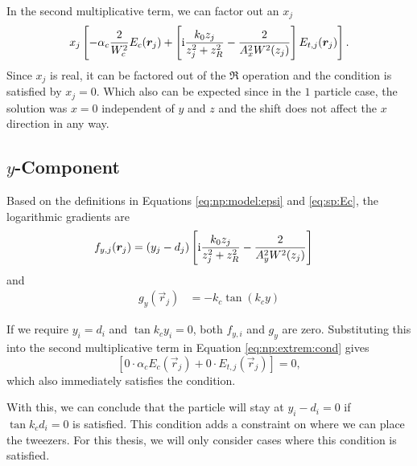 In the second multiplicative term, 
    we can factor out an $x_j$
\begin{equation}
   x_j \left[ 
        -\alpha_c \frac{2}{W_c^2}E_c(\bm{r}_j) 
        + \left[\mathrm{i} \frac{k_0z_j}{z_j^2 + z_R^2} 
        - \frac{2}{A_x^2 W^2(z_j)}\right]E_{t,j}(\bm{r}_j) 
    \right] .
\end{equation}
Since $x_j$ is real, it can be factored out of the $\Re$ operation 
    and the condition is satisfied by $x_j = 0$.
Which also can be expected since in the $1$ particle case, 
    the solution was $x = 0$ independent of $y$ and $z$
    and the shift does not affect the $x$ direction in any way.


\subsection{\texorpdfstring{$y$}{y}-Component}
\label{ssec:np:extrem:y}

Based on the definitions in Equations \eqref{eq:np:model:epsi} and \eqref{eq:sp:Ec},
    the logarithmic gradients are
\begin{align}
    f_{y,j}( \bm{r}_j) &= (y_j-d_j) \left[ \mathrm{i}\frac{k_0z_j}{z_j^2+z_R^2} - \frac{2}{A_y^2 W^2(z_j)}\right]
\end{align}
and
\begin{align}
g_y(\vec r_j) &= - k_c\tan(k_c y) 
\end{align}

If we require $y_i = d_i$ and $\tan k_c y_i = 0$, both $f_{y, i}$ and $g_y$ are zero.
Substituting this into the second multiplicative term in Equation \eqref{eq:np:extrem:cond} gives
\begin{equation}
  \left[ 0 \cdot \alpha_c E_c(\vec r_j) + 0\cdot E_{t,j}(\vec r_j) \right] {=} 0,
\end{equation}
which also immediately satisfies the condition.

With this, we can conclude that the particle will stay at $y_i - d_i = 0$ if $\tan k_c d_i =0 $ is satisfied. 
This condition adds a constraint on where we can place the tweezers.
For this thesis, we will only consider cases
    where this condition is satisfied.

